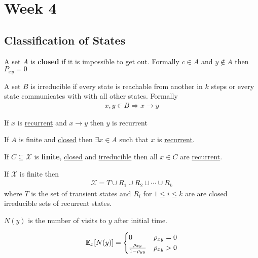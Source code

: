 \documentclass[12pt,a4paper]{article}
\begin{document}
\section{Week 4}
\subsection{Classification of States}
\begin{defn}[Closed]
    \label{closed}
    A set $A$ is \textbf{closed} if  it is impossible to get out. Formally $c\in A$ and $y\notin A$ then $P_{xy} = 0$
\end{defn}
\begin{defn}[irreducible]
    \label{irreducible}
    A set $B$ is irreducible if every state is reachable from another in $k$ steps or every state communicates with with all other states. Formally 
    \begin{align*}
        x,y\in B \Rightarrow x \to y
    \end{align*}
\end{defn}
\begin{lemma}
    If $x$ is \hyperref[recurrent]{recurrent} and $x\to y$ then $y$ is recurrent
\end{lemma}
\begin{lemma}
    \label{finiteclosed}
    If $A$ is finite and \hyperref[closed]{closed} then $\exists x \in A$ such that $x$ is \hyperref[recurrent]{recurrent}. 
\end{lemma}
\begin{thm}
    If $C\subseteq \mathcal{X}$ is \textbf{finite}, \hyperref[closed]{closed} and \hyperref[irreducible]{irreducible} then all $x\in C$ are \hyperref[recurrent]{recurrent}. 
\end{thm}
\begin{thm}
    If $\mathcal{X}$ is finite then 
    \begin{align*}
        \mathcal{X} = T \cup R_1 \cup R_2 \cup \cdots \cup R_k
    \end{align*}
    where $T$ is the set of transient states and $R_i$ for $1\leq i \leq k$ are are
    closed irreducible sets of recurrent states. 
\end{thm}
\begin{defn}
    $N(y)$ is the number of visits to $y$ after initial time.  
\end{defn}
\begin{lemma}
    \begin{align*}
        \mathbb{E}_x[N(y)] = \begin{cases}
            0 & \rho_{xy} = 0\\
            \frac{\rho_{xy}}{1-\rho_{yy}} & \rho_{xy} > 0
        \end{cases}
    \end{align*}
\end{lemma}
\end{document}
